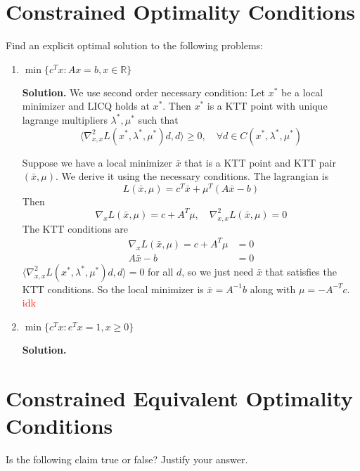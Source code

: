 \documentclass{article}
\begin{document}
\section{Constrained Optimality Conditions}
Find an explicit optimal solution to the following problems:
\begin{enumerate}
    \item $\min\{c^Tx : Ax = b, x \in \mathbb R\}$
    
    \textbf{Solution.} We use second order necessary condition: Let $x^*$ be a local minimizer and LICQ holds at $x^*$. Then $x^*$ is a KTT point with unique lagrange multipliers $\lambda^*, \mu^*$ such that $$\langle \nabla^2_{x, x} L(x^*, \lambda^*, \mu^*)d, d \rangle \geq 0, \quad \forall d \in C(x^*, \lambda^*, \mu^*)$$

    \bigskip
    Suppose we have a local minimizer $\bar x$ that is a KTT point and KTT pair $(\bar x, \mu)$. We derive it using the necessary conditions. The lagrangian is $$L(\bar x, \mu) = c^T\bar x + \mu^T(A\bar x - b)$$
    Then $$\nabla_x L(\bar x, \mu) = c + A^T\mu, \quad \nabla^2_{x, x} L(\bar x, \mu) = 0$$ The KTT conditions are 
    \begin{align*}
        \nabla_x L(\bar x, \mu) = c + A^T\mu &= 0 \\
        A\bar x - b &= 0
    \end{align*}
    $\langle \nabla^2_{x, x} L(x^*, \lambda^*, \mu^*)d, d \rangle = 0$ for all $d$, so we just need $\bar x$ that satisfies the KTT conditions. So the local minimizer is $\bar x = A^{-1}b$ along with $\mu = -A^{-T}c$. \textcolor{red}{idk}
    \item $\min\{c^Tx : e^Tx = 1, x \geq 0\}$
    
    \textbf{Solution.}
\end{enumerate}
\section{Constrained Equivalent Optimality Conditions}
Is the following claim true or false? Justify your answer.
\end{document}

